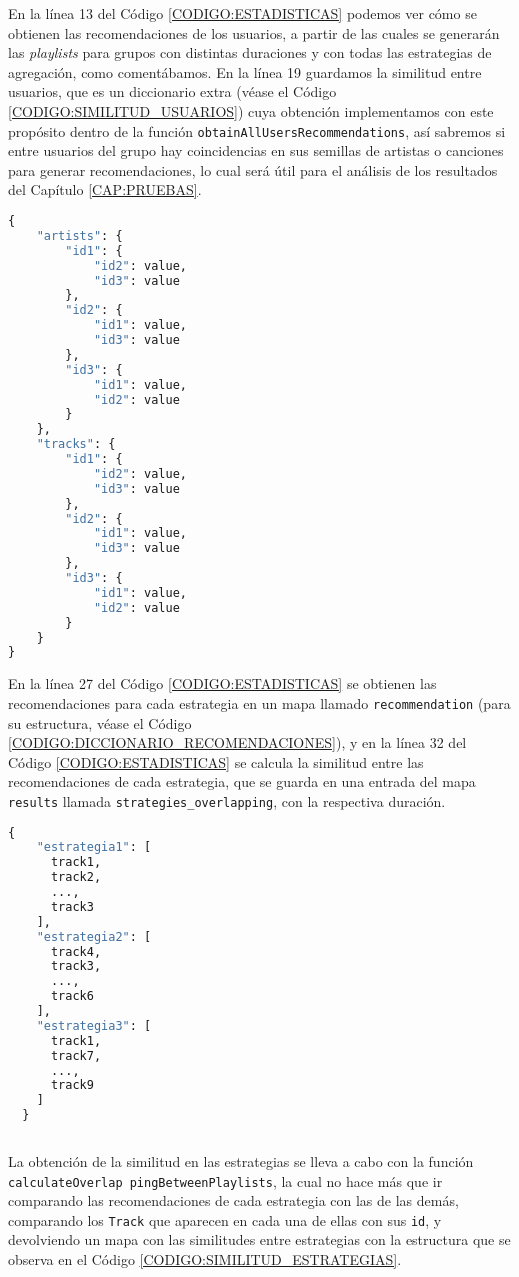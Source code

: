 En la línea 13 del Código \ref{CODIGO:ESTADISTICAS} podemos ver cómo se obtienen las recomendaciones de los usuarios, a partir de las 
cuales se generarán las \textit{playlists} para grupos con distintas duraciones y con todas las estrategias de agregación, como comentábamos.
En la línea 19 guardamos la similitud entre usuarios, que es un diccionario extra (véase el Código \ref{CODIGO:SIMILITUD_USUARIOS}) cuya obtención 
implementamos con este propósito dentro de la función \texttt{obtainAllUsersRecommendations}, así sabremos si entre usuarios del grupo hay 
coincidencias en sus semillas de artistas o canciones para generar recomendaciones, lo cual será útil para el análisis de los resultados 
del Capítulo \ref{CAP:PRUEBAS}. 

\begin{lstlisting}[language=python, caption=Diccionario de similitud entre usuarios, label=CODIGO:SIMILITUD_USUARIOS]
  {
    "artists": {
        "id1": {
            "id2": value,
            "id3": value
        },
        "id2": {
            "id1": value,
            "id3": value
        },
        "id3": {
            "id1": value,
            "id2": value
        }
    },
    "tracks": {
        "id1": {
            "id2": value,
            "id3": value
        },
        "id2": {
            "id1": value,
            "id3": value
        },
        "id3": {
            "id1": value,
            "id2": value
        }
    }
}
\end{lstlisting}
En la línea 27 del Código \ref{CODIGO:ESTADISTICAS} se obtienen las recomendaciones para cada estrategia en un mapa 
llamado \texttt{recommendation} (para su estructura, véase el Código \ref{CODIGO:DICCIONARIO_RECOMENDACIONES}), y en la línea 32 del Código \ref{CODIGO:ESTADISTICAS} 
se calcula la similitud entre las recomendaciones de cada estrategia, que se guarda en una entrada del mapa 
\texttt{results} llamada \texttt{strategies\_overlapping}, con la respectiva duración.

\begin{lstlisting}[language=python, caption=Diccionario de recomendaciones, label=CODIGO:DICCIONARIO_RECOMENDACIONES]
  {
    "estrategia1": [
      track1,
      track2,
      ...,
      track3
    ],
    "estrategia2": [
      track4,
      track3,
      ...,
      track6
    ],
    "estrategia3": [
      track1,
      track7,
      ...,
      track9
    ]
  }
  
\end{lstlisting}

La obtención de la similitud en las estrategias se lleva a cabo con la función \texttt{calculateOverlap pingBetweenPlaylists}, la cual no hace más que 
ir comparando las recomendaciones de cada estrategia con las de las demás, comparando los \texttt{Track} que aparecen en cada una de ellas con sus \texttt{id}, 
y devolviendo un mapa con las similitudes entre estrategias con la estructura que se observa en el Código \ref{CODIGO:SIMILITUD_ESTRATEGIAS}.

